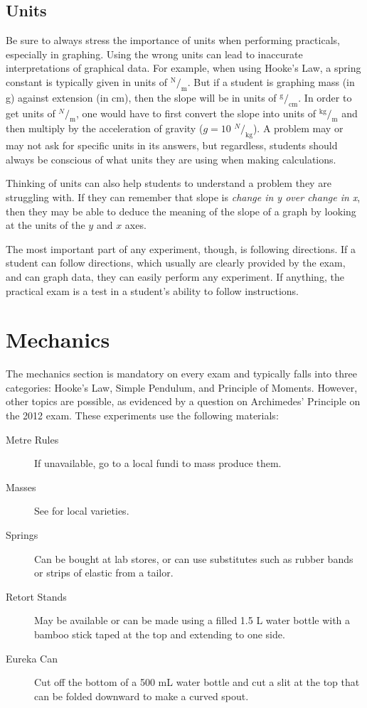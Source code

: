 \subsection{Units}
Be sure to always stress the importance of units when performing practicals, especially in graphing. Using the wrong units can lead to inaccurate interpretations of graphical data. For example, when using Hooke's Law, a spring constant is typically given in units of $^{\text{N}}/_{\text{m}}$. But if a student is graphing mass (in g) against extension (in cm), then the slope will be in units of $^{\text{g}}/_{\text{cm}}$. In order to get units of $^N/_{\text{m}}$, one would have to first convert the slope into units of $^{\text{kg}}/_{\text{m}}$ and then multiply by the acceleration of gravity ($g = 10$ $^N/_{\text{kg}}$). A problem may or may not ask for specific units in its answers, but regardless, students should always be conscious of what units they are using when making calculations.

Thinking of units can also help students to understand a problem they are struggling with. If they can remember that slope is \emph{change in y over change in x}, then they may be able to deduce the meaning of the slope of a graph by looking at the units of the $y$ and $x$ axes.

The most important part of any experiment, though, is following directions. If a
student can follow directions, which usually are clearly provided by the exam, and can
graph data, they can easily perform any experiment. If anything, the practical exam is a
test in a student’s ability to follow instructions.

\section{Mechanics} 

The mechanics section is mandatory on every exam and typically falls into three
categories: Hooke’s Law, Simple Pendulum, and Principle of Moments. However, other topics are possible, as evidenced by a question on Archimedes' Principle on the 2012 exam. These experiments use the following materials:
\begin{description}
\item[Metre Rules]{If unavailable, go to a local fundi to mass produce them.}
\item[Masses]{See  for local varieties.}
\item[Springs]{Can be bought at lab stores, or can use substitutes such as rubber bands or strips of elastic from a tailor.}
\item[Retort Stands]{May be available or can be made using a filled 1.5 L water bottle with a bamboo stick taped at the top and extending to one side.}
\item[Eureka Can]{Cut off the bottom of a 500 mL water bottle and cut a slit at the top that can be folded downward to make a curved spout.}
\end{description}

